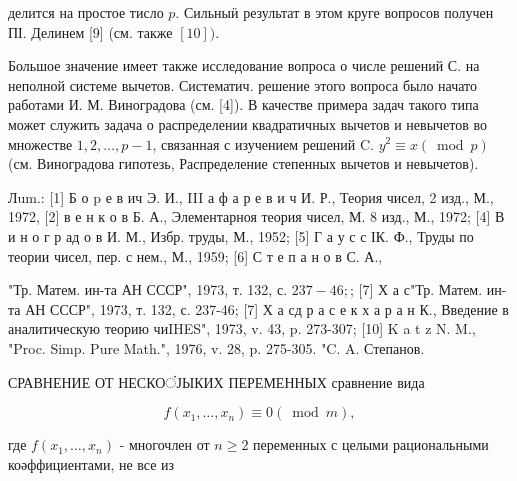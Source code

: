 \documentclass[10pt]{article}
\begin{document}
делится на простое тисло $p$. Сильныӥ результат в этом круге вопросов получен ПІ. Делинем [9] (см. также $[10])$.



Большое значение имеет также исследование вопроса о числе решений С. на неполной системе вычетов. Систематич. решение этого вопроса было начато работами И. М. Виноградова (см. [4]). В качестве примера задач такого типа может служить задача о распределении квадратичных вычетов и невычетов во множестве $1,2, \ldots, p-1$, связанная с изучением решений $\mathrm{C}$. $y^{2} \equiv x(\bmod p)$ (см. Виноградова гипотезь, Распределение степенных вычетов и невычетов).



Лum.: [1] Б о p е в ич Э. И., III а ф а р е в и ч И. Р., Теория чисел, 2 изд., М., 1972, [2] в е н к о в Б. А., Элементарноя теория чисел, М. 8 изд., М., 1972; [4] В и н о г р ад о в И. М., Избр. труды, М., 1952; [5] Г а у с с ІК. Ф., Труды по теории чисел, пер. с нем., М., 1959; [6] С т е п а н о в С. А.,

"Тр. Матем. ин-та АН СССР", 1973, т. 132, с. $237-46 ;$; [7] Х а с"Тр. Матем. ин-та АН СССР", 1973, т. 132, с. 237-46; [7] Х а сд р а с е к х а р а н К., Введение в аналитическую теорию чиIHES", 1973, v. 43, p. 273-307; [10] K a t z N. M., "Proc. Simp. Pure Math.", 1976, v. 28, p. 275-305. "C. A. Степанов.



СРАВНЕНИЕ ОТ НЕСКОंЈЫКИХ ПЕРЕМЕННЫХ сравнение вида



\[

f\left(x_{1}, \ldots, x_{n}\right) \equiv 0(\bmod m),

\]



где $f\left(x_{1}, \ldots, x_{n}\right)$ - многочлен от $n \geqslant 2$ переменных с целыми рациональными коәффициентами, не все из
\end{document}
